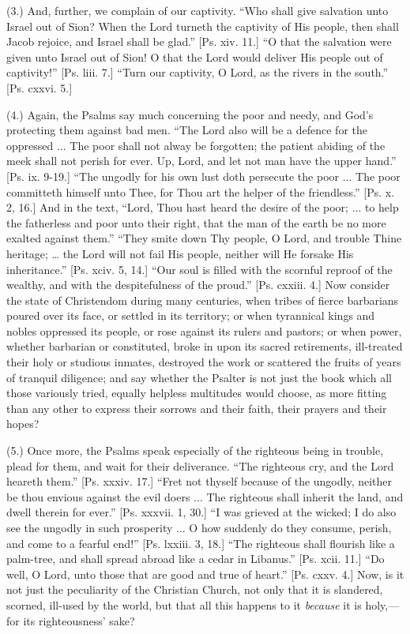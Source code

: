 (3.) And, further, we complain of our captivity. ``Who shall
give salvation unto Israel out of Sion? When the Lord turneth the
captivity of His people, then shall Jacob rejoice, and Israel shall be
glad.'' [Ps. xiv. 11.] ``O that the salvation were given unto
Israel out of Sion! O that the Lord would deliver His people out of
captivity!'' [Ps. liii. 7.] ``Turn our captivity, O Lord, as
the rivers in the south.'' [Ps. cxxvi. 5.]

(4.) Again, the Psalms say much concerning the poor and needy, and
God's protecting them against bad men. ``The Lord also will be a
defence for the oppressed ... The poor shall not alway be forgotten;
the patient abiding of the meek shall not perish for ever. Up, Lord,
and let not man have the upper hand.'' [Ps. ix. 9-19.] ``The
ungodly for his own lust doth persecute the poor ... The poor
committeth himself unto Thee, for Thou art the helper of the
friendless.'' [Ps. x. 2, 16.] And in the text, ``Lord, Thou
hast heard the desire of the poor; ... to help the fatherless and poor
unto their right, that the man of the earth be no more exalted against
them.'' ``They smite down Thy people, O Lord, and trouble
Thine heritage; … the Lord will not fail His people, neither will He
forsake His inheritance.'' [Ps. xciv. 5, 14.] ``Our soul is
filled with the scornful reproof of the wealthy, and with the
despitefulness of the proud.'' [Ps. cxxiii. 4.] Now consider the
state of Christendom during many centuries, when tribes of fierce
barbarians poured over its face, or settled in its territory; or when
tyrannical kings and nobles oppressed its people, or rose against its
rulers and pastors; or when power, whether barbarian or constituted,
broke in upon its sacred retirements, ill-treated their holy or
studious inmates, destroyed the work or scattered the fruits of years
of tranquil diligence; and say whether the Psalter is not just the
book which all those variously tried, equally helpless multitudes
would choose, as more fitting than any other to express their sorrows
and their faith, their prayers and their hopes?

(5.) Once more, the Psalms speak especially of the righteous being
in trouble, plead for them, and wait for their deliverance. ``The
righteous cry, and the Lord heareth them.'' [Ps. xxxiv. 17.]
``Fret not thyself because of the ungodly, neither be thou envious
against the evil doers ... The righteous shall inherit the land, and
dwell therein for ever.'' [Ps. xxxvii. 1, 30.] ``I was grieved
at the wicked; I do also see the ungodly in such prosperity ... O how
suddenly do they consume, perish, and come to a fearful end!''
[Ps. lxxiii. 3, 18.] ``The righteous shall flourish like a
palm-tree, and shall spread abroad like a cedar in Libanus.'' [Ps.
xcii. 11.] ``Do well, O Lord, unto those that are good and true of
heart.'' [Ps. cxxv. 4.] Now, is it not just the peculiarity of the
Christian Church, not only that it is slandered, scorned, ill-used by
the world, but that all this happens to it \emph{because} it is holy,—for
its righteousness' sake?

